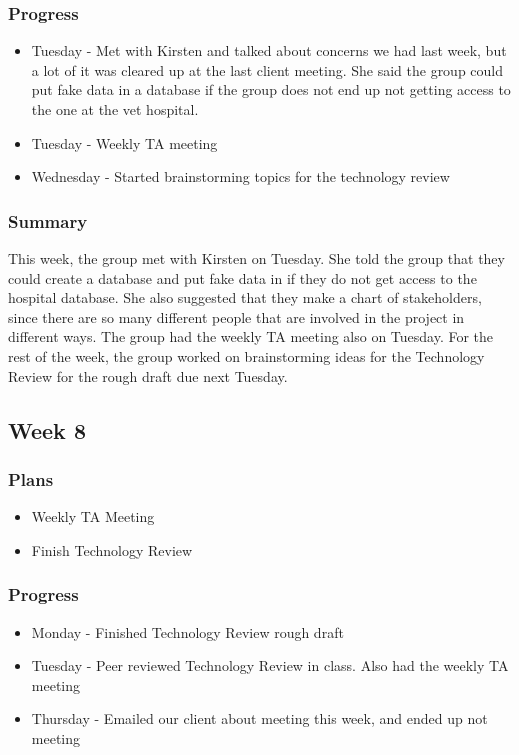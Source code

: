 \documentclass[onecolumn, draftclsnofoot,10pt, compsoc]{IEEEtran}
\begin{document}
\subsubsection{Progress}
\begin{itemize}
\item Tuesday - Met with Kirsten and talked about concerns we had last week, but a lot of it was cleared up at the last client meeting. She said the group could put fake data in a database if the group does not end up not getting access to the one at the vet hospital.
\item Tuesday - Weekly TA meeting
\item Wednesday - Started brainstorming topics for the technology review

\end{itemize}
\subsubsection{Summary}
This week, the group met with Kirsten on Tuesday. She told the group that they could create a database and put fake data in if they do not get access to the hospital database. She also suggested that they make a chart of stakeholders, since there are so many different people that are involved in the project in different ways. The group had the weekly TA meeting also on Tuesday. For the rest of the week, the group worked on brainstorming ideas for the Technology Review for the rough draft due next Tuesday.
\subsection{Week 8}

\subsubsection{Plans}
\begin{itemize}
\item Weekly TA Meeting
\item Finish Technology Review

\end{itemize}

\subsubsection{Progress}
\begin{itemize}
\item Monday - Finished Technology Review rough draft
\item Tuesday - Peer reviewed Technology Review in class. Also had the weekly TA meeting
\item Thursday - Emailed our client about meeting this week, and ended up not meeting

\end{itemize}
\end{document}
